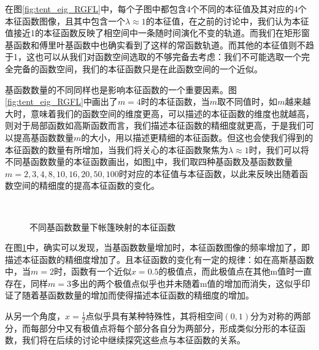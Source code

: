 在图\ref{fig:tent_eig_RGFL}中，每个子图中都包含4个不同的本征值及其对应的4个本征函数图像，且其中包含一个$\lambda\approx 1$的本征值，在之前的讨论中，我们认为本征值接近1的本征函数反映了相空间中一条随时间演化不变的轨道。而我们在矩形窗基函数和傅里叶基函数中也确实看到了这样的常函数轨道。而其他的本征值则不趋于1，这也可以从我们对函数空间选取的不够完备去考虑：我们不可能选取一个完全完备的函数空间，我们的本征函数只是在此函数空间的一个近似。

基函数数量的不同同样也是影响本征函数的一个重要因素。图\ref{fig:tent_eig_RGFL}中画出了$m=4$时的本征函数，当$m$取不同值时，如$m$越来越大时，意味着我们的函数空间的维度更高，可以描述的本征函数的维度也就越高，则对于局部函数如高斯函数而言，我们描述本征函数的精细度就更高，于是我们可以提高基函数数量$m$的大小，用以描述更精细的本征函数。但这也会使我们得到的本征函数的数量有所增加，当我们将关心的本征函数聚焦为$\lambda\approx 1$时，我们可以将不同基函数数量的本征函数画出，如图\ref{fig:tent_eig_RGFL_multim}中，我们取四种基函数及基函数数量$m=2,3,4,8,10,16,20,50,100$时对应的本征值与本征函数，以此来反映出随着函数空间的精细度的提高本征函数的变化。

\begin{figure}[!]
  \centering
    \\
  \caption{不同基函数数量下帐篷映射的本征函数}\label{fig:tent_eig_RGFL_multim}
\end{figure}

在图\ref{fig:tent_eig_RGFL_multim}中，确实可以发现，当基函数数量增加时，本征函数图像的频率增加了，即描述本征函数的精细度增加了。且本征函数的变化有一定的规律：如在高斯基函数中，当$m=2$时，函数有一个近似$x=0.5$的极值点，而此极值点在其他m值时一直存在，同样$m=3$多出的两个极值点似乎也并未随着m值的增加而消失，这似乎印证了随着基函数数量的增加而使得描述本征函数的精细度的增加。

从另一个角度，$x=\frac{1}{2}$点似乎具有某种特殊性，其将相空间$(0,1)$分为对称的两部分，而每部分中又有极值点将每个部分各自分为两部分，形成类似分形的本征函数，我们将在后续的讨论中继续探究这些点与本征函数的关系。

